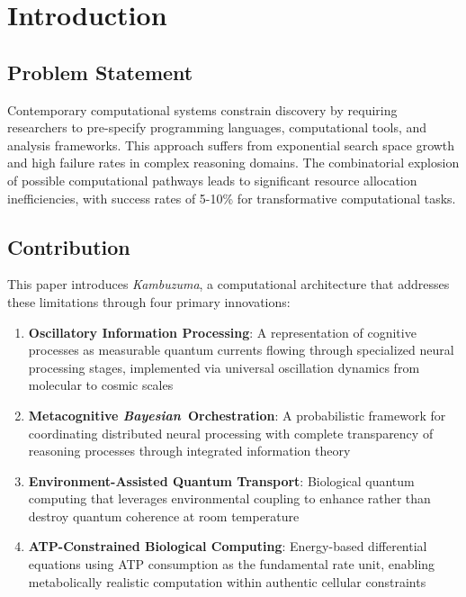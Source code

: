 \documentclass[11pt,a4paper]{article}
\newcommand{\kambuzuma}{\textit{Kambuzuma}}
\newcommand{\bayesian}{\textit{Bayesian}}
\begin{document}
\tableofcontents
\newpage

\section{Introduction}

\subsection{Problem Statement}

Contemporary computational systems constrain discovery by requiring researchers to pre-specify programming languages, computational tools, and analysis frameworks. This approach suffers from exponential search space growth and high failure rates in complex reasoning domains. The combinatorial explosion of possible computational pathways leads to significant resource allocation inefficiencies, with success rates of 5-10\% for transformative computational tasks.

\subsection{Contribution}

This paper introduces \kambuzuma, a computational architecture that addresses these limitations through four primary innovations:

\begin{enumerate}
\item \textbf{Oscillatory Information Processing}: A representation of cognitive processes as measurable quantum currents flowing through specialized neural processing stages, implemented via universal oscillation dynamics from molecular to cosmic scales
\item \textbf{Metacognitive \bayesian\ Orchestration}: A probabilistic framework for coordinating distributed neural processing with complete transparency of reasoning processes through integrated information theory
\item \textbf{Environment-Assisted Quantum Transport}: Biological quantum computing that leverages environmental coupling to enhance rather than destroy quantum coherence at room temperature
\item \textbf{ATP-Constrained Biological Computing}: Energy-based differential equations using ATP consumption as the fundamental rate unit, enabling metabolically realistic computation within authentic cellular constraints
\end{enumerate}
\end{document}
